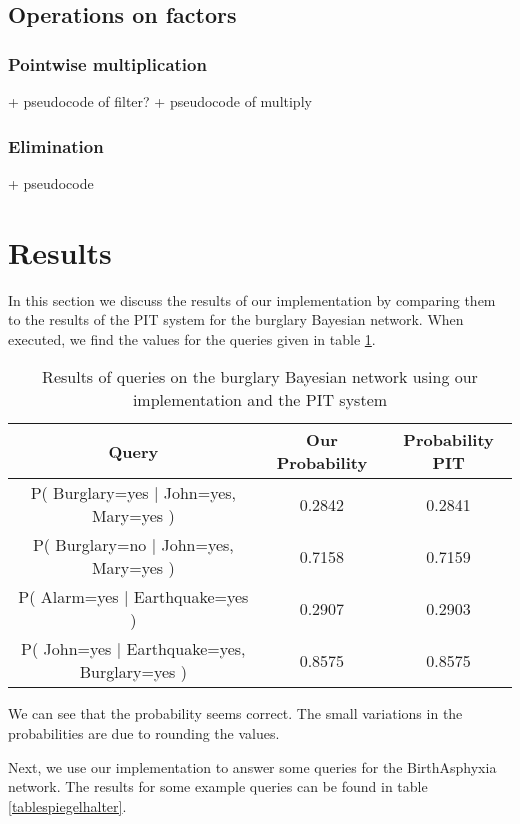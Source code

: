 \documentclass[10pt,a4paper]{article}
\begin{document}
\subsection{Operations on factors}
\subsubsection{Pointwise multiplication}
+ pseudocode of filter?
+ pseudocode of multiply
\subsubsection{Elimination}
+ pseudocode
\section{Results}
In this section we discuss the results of our implementation by comparing them to the results of the PIT system for the burglary Bayesian network. When executed, we find the values for the queries given in table \ref{tableburglary}.
\begin{table}[H]
\begin{tabular}{|c|c|c|}
\hline 
\textbf{Query} & \textbf{Our Probability} & \textbf{Probability PIT} \\ 
\hline 
P( Burglary=yes $|$ John=yes, Mary=yes ) & 0.2842 & 0.2841 \\ 
\hline 
P( Burglary=no $|$ John=yes, Mary=yes ) & 0.7158 & 0.7159 \\ 
\hline 
P( Alarm=yes $|$ Earthquake=yes ) & 0.2907 & 0.2903 \\ 
\hline 
P( John=yes $|$ Earthquake=yes, Burglary=yes ) & 0.8575 & 0.8575 \\ 
\hline 
\end{tabular} 
\caption{Results of queries on the burglary Bayesian network using our implementation and the PIT system}
\label{tableburglary}
\end{table}

We can see that the probability seems correct. The small variations in the probabilities are due to rounding the values.

Next, we use our implementation to answer some queries for the BirthAsphyxia network. The results  for some example queries can be found in table \ref{tablespiegelhalter}.
\end{document}
